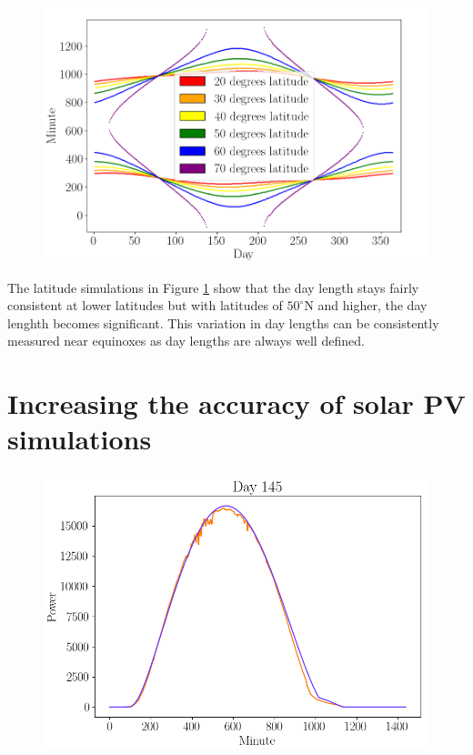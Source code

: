 \begin{figure}[ht!]
\centering
\includegraphics[width=1\linewidth]{pics/different_latitudes}
\label{fig_poa_var_lat}
\end{figure}

\noindent The latitude simulations in Figure \ref{fig_poa_var_lat} show that the day length stays fairly consistent at lower latitudes but with latitudes of $50^\circ$N and higher, the day lenghth becomes significant. This variation in day lengths can be consistently measured near equinoxes as day lengths are always well defined.



\newpage

\section{Increasing the accuracy of solar PV simulations}
\label{section_increased_accuracy_simulations}


\begin{figure}[h]
\centering
\includegraphics[width=0.7\linewidth]{pics/poa_eval_single_day}
\label{fig-poa_eval_single_day}
\end{figure}

